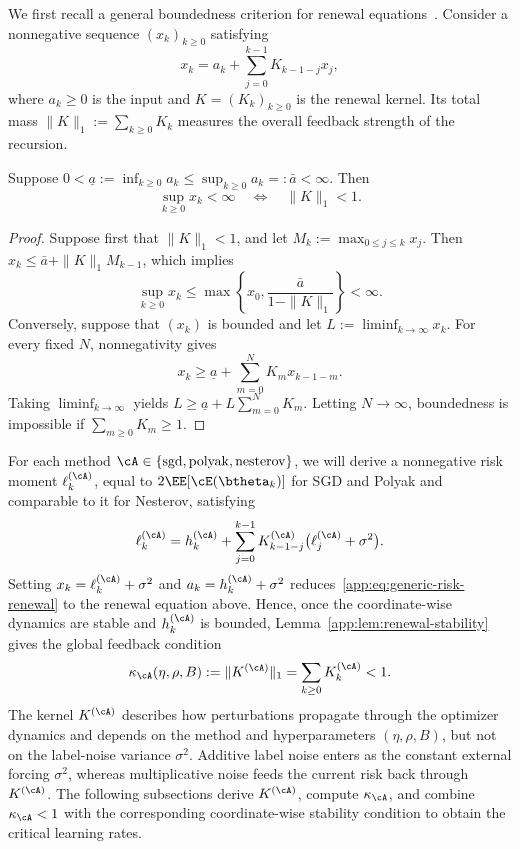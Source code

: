 \documentclass[11pt]{article}
\newcommand{\sgd}{\mathrm{sgd}}
\newcommand{\polyak}{\mathrm{polyak}}
\newcommand{\nesterov}{\mathrm{nesterov}}
\begin{document}
We first recall a general boundedness criterion for renewal equations~\citep{feller1991introduction}. Consider a nonnegative sequence \((x_k)_{k\geq0}\) satisfying
\[
x_k=a_k+\sum_{j=0}^{k-1}K_{k-1-j}x_j,
\]
where \(a_k\geq0\) is the input and \(K=(K_k)_{k\geq0}\) is the renewal kernel. Its total mass \(\|K\|_1:=\sum_{k\geq0}K_k\) measures the overall feedback strength of the recursion.

\begin{lemma}
\label{app:lem:renewal-stability}
Suppose \(0<\underline a:=\inf_{k\geq0}a_k\leq\sup_{k\geq0}a_k=:\bar a<\infty\). Then
\[
\sup_{k\geq0}x_k<\infty\quad\Longleftrightarrow\quad \|K\|_1<1.
\]
\end{lemma}

\begin{proof}
Suppose first that \(\|K\|_1<1\), and let \(M_k:=\max_{0\leq j\leq k}x_j\). Then \(x_k\leq\bar a+\|K\|_1M_{k-1}\), which implies
\[
\sup_{k\geq0}x_k\leq\max\left\{x_0,\frac{\bar a}{1-\|K\|_1}\right\}<\infty.
\]
Conversely, suppose that \((x_k)\) is bounded and let \(L:=\liminf_{k\to\infty}x_k\). For every fixed \(N\), nonnegativity gives
\[
x_k\geq\underline a+\sum_{m=0}^{N}K_mx_{k-1-m}.
\]
Taking \(\liminf_{k\to\infty}\) yields \(L\geq\underline a+L\sum_{m=0}^{N}K_m\). Letting \(N\to\infty\), boundedness is impossible if \(\sum_{m\geq0}K_m\geq1\).
\end{proof}

For each method \(\cA\in\{\sgd,\polyak,\nesterov\}\), we will derive a nonnegative risk moment \(\ell_k^{(\cA)}\), equal to \(2\EE[\cE(\btheta_k)]\) for SGD and Polyak and comparable to it for Nesterov, satisfying
\begin{equation}
\label{app:eq:generic-risk-renewal}
\ell_k^{(\cA)}=h_k^{(\cA)}+\sum_{j=0}^{k-1}K_{k-1-j}^{(\cA)}\bigl(\ell_j^{(\cA)}+\sigma^2\bigr).
\end{equation}
Setting \(x_k=\ell_k^{(\cA)}+\sigma^2\) and \(a_k=h_k^{(\cA)}+\sigma^2\) reduces~\eqref{app:eq:generic-risk-renewal} to the renewal equation above. Hence, once the coordinate-wise dynamics are stable and \(h_k^{(\cA)}\) is bounded, Lemma~\ref{app:lem:renewal-stability} gives the global feedback condition
\[
\kappa_{\cA}(\eta,\rho,B):=\|K^{(\cA)}\|_1=\sum_{k\geq0}K_k^{(\cA)}<1.
\]
The kernel \(K^{(\cA)}\) describes how perturbations propagate through the optimizer dynamics and depends on the method and hyperparameters \((\eta,\rho,B)\), but not on the label-noise variance \(\sigma^2\). Additive label noise enters as the constant external forcing \(\sigma^2\), whereas multiplicative noise feeds the current risk back through \(K^{(\cA)}\). The following subsections derive \(K^{(\cA)}\), compute \(\kappa_{\cA}\), and combine \(\kappa_{\cA}<1\) with the corresponding coordinate-wise stability condition to obtain the critical learning rates.
\end{document}
